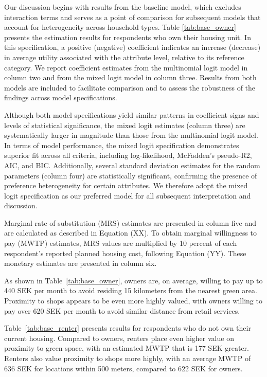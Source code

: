 \documentclass[3p,11pt ]{elsarticle}
\begin{document}
Our discussion begins with results from the baseline model, which excludes interaction terms and serves as a point of comparison for subsequent models that account for heterogeneity across household types.
Table \ref{tab:base_owner} presents the estimation results for respondents who own their housing unit.
In this specification, a positive (negative) coefficient indicates an increase (decrease) in average utility associated with the attribute level, relative to its reference category. We report coefficient estimates from the multinomial logit model in column two and from the mixed logit model in column three.
Results from both models are included to facilitate comparison and to assess the robustness of the findings across model specifications.




Although both model specifications yield similar patterns in coefficient signs and levels of statistical significance, the mixed logit estimates (column three) are systematically larger in magnitude than those from the multinomial logit model.
In terms of model performance, the mixed logit specification demonstrates superior fit across all criteria, including log-likelihood, McFadden's pseudo-R2, AIC, and BIC.
Additionally, several standard deviation estimates for the random parameters (column four) are statistically significant, confirming the presence of preference heterogeneity for certain attributes.
We therefore adopt the mixed logit specification as our preferred model for all subsequent interpretation and discussion.

Marginal rate of substitution (MRS) estimates are presented in column five and are calculated as described in Equation (XX). To obtain marginal willingness to pay (MWTP) estimates, MRS values are multiplied by 10 percent of each respondent's reported planned housing cost, following Equation (YY). These monetary estimates are presented in column six.

As shown in Table~\ref{tab:base_owner},
owners are, on average, willing to pay up to 440 SEK per month to avoid residing 15 kilometers from the nearest green area. Proximity to shops appears to be even more highly valued, with owners willing to pay over 620 SEK per month to avoid similar distance from retail services.

Table~\ref{tab:base_renter} presents results for respondents who do not own their current housing. Compared to owners, renters place even higher value on proximity to green space, with an estimated MWTP that is 177 SEK greater. Renters also value proximity to shops more highly, with an average MWTP of 636 SEK for locations within 500 meters, compared to 622 SEK for owners.
\end{document}
